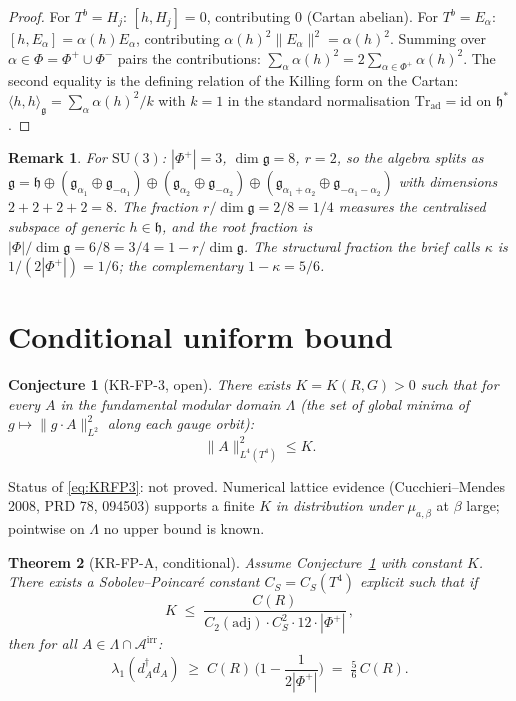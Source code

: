 \documentclass[11pt]{article}
\newtheorem{theorem}{Theorem}
\newtheorem{conjecture}[theorem]{Conjecture}
\newtheorem*{remark*}{Remark}
\begin{document}
\begin{proof}
For $T^b=H_j$: $[h,H_j]=0$, contributing 0 (Cartan abelian).
For $T^b=E_\alpha$: $[h,E_\alpha]=\alpha(h)E_\alpha$, contributing $\alpha(h)^2\|E_\alpha\|^2=\alpha(h)^2$.
Summing over $\alpha\in\Phi=\Phi^+\cup\Phi^-$ pairs the contributions: $\sum_\alpha\alpha(h)^2=2\sum_{\alpha\in\Phi^+}\alpha(h)^2$. The second equality is the defining relation of the Killing form on the Cartan: $\langle h,h\rangle_\mathfrak{g}=\sum_\alpha\alpha(h)^2/k$ with $k=1$ in the standard normalisation $\mathrm{Tr}_{\mathrm{ad}}=\mathrm{id}$ on $\mathfrak{h}^*$.
\end{proof}

\begin{remark*}
For $\mathrm{SU}(3)$: $|\Phi^+|=3$, $\dim\mathfrak{g}=8$, $r=2$, so the algebra splits as $\mathfrak{g}=\mathfrak{h}\oplus(\mathfrak{g}_{\alpha_1}\oplus\mathfrak{g}_{-\alpha_1})\oplus(\mathfrak{g}_{\alpha_2}\oplus\mathfrak{g}_{-\alpha_2})\oplus(\mathfrak{g}_{\alpha_1+\alpha_2}\oplus\mathfrak{g}_{-\alpha_1-\alpha_2})$ with dimensions $2+2+2+2=8$. The fraction $r/\dim\mathfrak{g}=2/8=1/4$ measures the \emph{centralised} subspace of generic $h\in\mathfrak{h}$, and the \emph{root} fraction is $|\Phi|/\dim\mathfrak{g}=6/8=3/4=1-r/\dim\mathfrak{g}$. The structural fraction the brief calls $\kappa$ is $1/(2|\Phi^+|)=1/6$; the complementary $1-\kappa=5/6$.
\end{remark*}

\section{Conditional uniform bound}

\begin{conjecture}[KR-FP-3, open]\label{conj:KR-FP-3}
There exists $K=K(R,G)>0$ such that for every $A$ in the fundamental modular domain $\Lambda$ (the set of global minima of $g\mapsto\|g\cdot A\|^2_{L^2}$ along each gauge orbit):
\begin{equation}
\|A\|^2_{L^4(T^4)}\leq K.\label{eq:KRFP3}
\end{equation}
\end{conjecture}

Status of \eqref{eq:KRFP3}: not proved. Numerical lattice evidence (Cucchieri--Mendes 2008, PRD 78, 094503) supports a finite $K$ \emph{in distribution under} $\mu_{a,\beta}$ at $\beta$ large; pointwise on $\Lambda$ no upper bound is known.

\begin{theorem}[KR-FP-A, conditional]\label{thm:KR-FP-A}
Assume Conjecture~\ref{conj:KR-FP-3} with constant $K$. There exists a Sobolev--Poincar\'e constant $C_S=C_S(T^4)$ explicit such that if
\begin{equation}
K\;\leq\;\frac{C(R)}{C_2(\mathrm{adj})\cdot C_S^2\cdot 12\cdot|\Phi^+|}\,,
\end{equation}
then for all $A\in\Lambda\cap\mathcal{A}^{\mathrm{irr}}$:
\begin{equation}
\lambda_1(d_A^\dagger d_A)\;\geq\;C(R)\,\Big(1-\frac{1}{2|\Phi^+|}\Big)\;=\;\tfrac{5}{6}\,C(R).
\end{equation}
\end{theorem}
\end{document}
